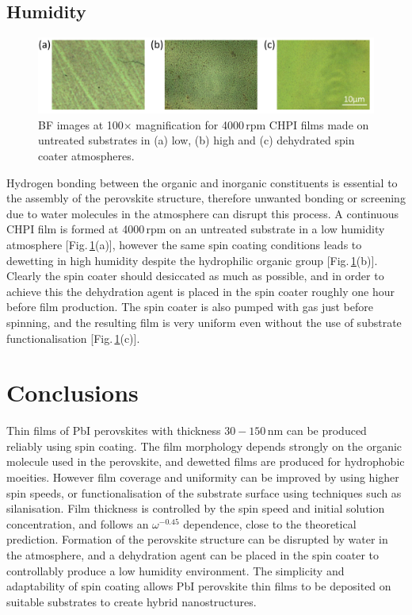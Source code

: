 \subsection{Humidity}
\begin{figure}[] 
\centering    
\includegraphics[width=\textwidth]{Fig8}
\caption{BF images at 100$\times$ magnification for 4000\,rpm CHPI films made on untreated substrates in (a) low, (b) high and (c) dehydrated spin coater atmospheres.}
\label{4Fig8}
\end{figure}
Hydrogen bonding between the organic and inorganic constituents is essential to the assembly of the perovskite structure, therefore unwanted bonding or screening due to water molecules in the atmosphere can disrupt this process. A continuous CHPI film is formed at 4000\,rpm on an untreated substrate in a low humidity atmosphere [Fig.\,\ref{4Fig8}(a)], however the same spin coating conditions leads to dewetting in high humidity despite the hydrophilic organic group [Fig.\,\ref{4Fig8}(b)]. Clearly the spin coater should desiccated as much as possible, and in order to achieve this the dehydration agent  is placed in the spin coater roughly one hour before film production. The spin coater is also pumped with  gas just before spinning, and the resulting film is very uniform even without the use of substrate functionalisation [Fig.\,\ref{4Fig8}(c)].

\section{Conclusions}
Thin films of PbI perovskites with thickness $30-150$\,nm can be produced reliably using spin coating. The film morphology depends strongly on the organic molecule used in the perovskite, and dewetted films are produced for hydrophobic moeities. However film coverage and uniformity can be improved by using higher spin speeds, or functionalisation of the substrate surface using techniques such as silanisation. Film thickness is controlled by the spin speed and initial solution concentration, and follows an $\omega^{-0.45}$ dependence, close to the theoretical prediction. Formation of the perovskite structure can be disrupted by water in the atmosphere, and a dehydration agent can be placed in the spin coater to controllably produce a low humidity environment. The simplicity and adaptability of spin coating allows PbI perovskite thin films to be deposited on suitable substrates to create hybrid nanostructures.